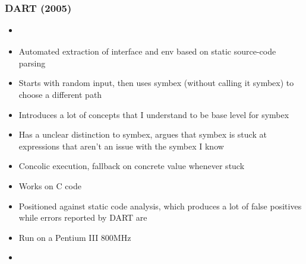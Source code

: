 \documentclass{article}
\begin{document}
\subsubsection{DART (2005)}
\begin{itemize}
    \item \cite{DART}
    \item Automated extraction of interface and env based on static source-code parsing
    \item Starts with random input, then uses symbex (without calling it symbex) to choose a different path
    \item Introduces a lot of concepts that I understand to be base level for symbex
    \item Has a unclear distinction to symbex, argues that symbex is stuck at expressions that aren't an issue with the symbex I know
    \item Concolic execution, fallback on concrete value whenever stuck
    \item Works on C code
    \item Positioned against static code analysis, which produces a lot of false positives while errors reported by DART are \cite{DART}
    \item Run on a Pentium III 800MHz
    \item {}\cite{DART}
\end{itemize}
\end{document}

